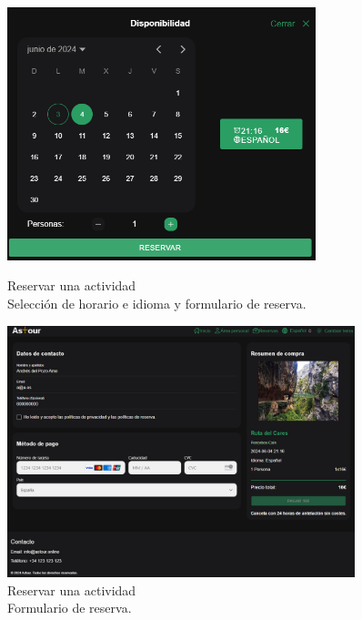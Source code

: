 \begin{figure}[H]
	\centering
	\begin{minipage}{0.45\textwidth}
		\centering
		\includegraphics[width=0.8\textwidth]{7-Construccion/Manuales/web/disponibilidad reservar.png}
		\caption{Reservar una actividad \\ Selección de horario e idioma y formulario de reserva.}
		\label{fig:disponibilidad-reservar}
	\end{minipage}
	\hfill
	\begin{minipage}{0.45\textwidth}
		\centering
		\includegraphics[width=0.9\textwidth]{7-Construccion/Manuales/web/formulario-reservar.png}
		\caption{Reservar una actividad \\ Formulario de reserva.}
		\label{fig:formulario-reservar}
	\end{minipage}
\end{figure}

